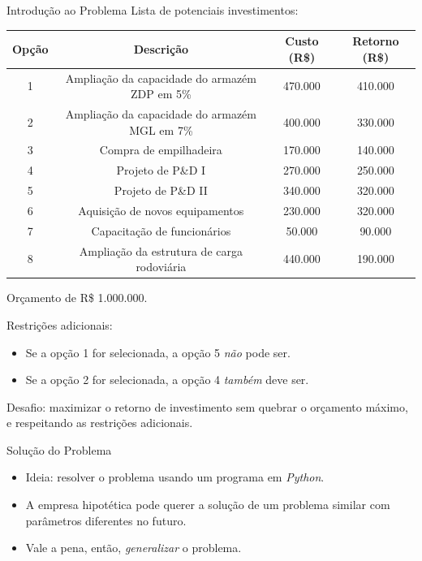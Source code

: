 \documentclass{beamer}
\begin{document}
\begin{frame}{Introdução ao Problema}\pause
Lista de potenciais investimentos:\\
\scriptsize
\pause
\begin{center}
\begin{tabular}{ |cccc| } 
\hline
Opção & Descrição & Custo (R\$) & Retorno (R\$) \\
\hline
\hline
1 & Ampliação da capacidade do armazém ZDP em 5\% & 470.000 & 410.000 \\
2 & Ampliação da capacidade do armazém MGL em 7\% & 400.000 & 330.000 \\
3 & Compra de empilhadeira & 170.000 & 140.000 \\
4 & Projeto de P\&D I & 270.000 & 250.000 \\
5 & Projeto de P\&D II & 340.000 & 320.000 \\
6 & Aquisição de novos equipamentos & 230.000 & 320.000 \\
7 & Capacitação de funcionários & 50.000 & 90.000 \\
8 & Ampliação da estrutura de carga rodoviária & 440.000 & 190.000 \\
\hline
\end{tabular}\pause
\end{center}

\normalsize
Orçamento de R\$ 1.000.000.\pause

Restrições adicionais:\pause
\begin{itemize}
\item Se a opção 1 for selecionada, a opção 5 \textit{não} pode ser.\pause
\item Se a opção 2 for selecionada, a opção 4 \textit{também} deve ser.\pause
\end{itemize}

Desafio: maximizar o retorno de investimento sem quebrar o orçamento máximo, e respeitando as restrições adicionais.

\end{frame}

\begin{frame}{Solução do Problema}
\begin{itemize}
\item Ideia: resolver o problema usando um programa em \emph{Python}.\pause
\item A empresa hipotética pode querer a solução de um problema similar com parâmetros diferentes no futuro.\pause
\item Vale a pena, então, \emph{generalizar} o problema.
\end{itemize}
\end{frame}
\end{document}

